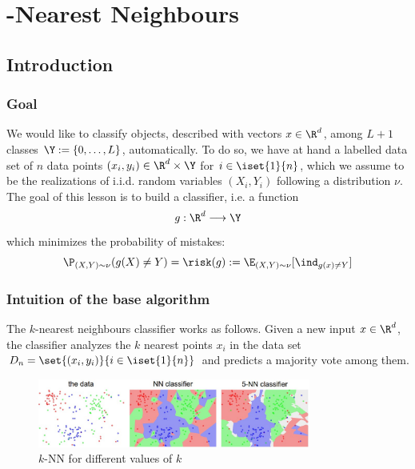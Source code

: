 \documentclass[toc, titlepaged]{../cs-classes/cs-classes}
\begin{document}

\section{-Nearest Neighbours}
\subsection{Introduction}
\subsubsection{Goal}
We would like to classify objects, described with vectors $x\in\R^d$, among $L+1$ classes $\Y:=\{0, \dots, L\}$, automatically. To do so, we have at hand a labelled data set of $n$ data points $(x_i, y_i)\in\R^d\times\Y$ for $i\in\iset{1}{n}$, which we assume to be the realizations of i.i.d. random variables $(X_i, Y_i)$ following a distribution $\nu$. The goal of this lesson is to build a classifier, i.e. a function
\begin{equation*}
    g:\R^d\longrightarrow\Y
\end{equation*}
which minimizes the probability of mistakes:
\begin{equation*}
    \P_{(X, Y)\sim\nu}(g(X)\neq Y) = \risk(g) := \E_{(X, Y)\sim\nu}[\ind_{g(x)\neq Y}]
\end{equation*}

\subsubsection{Intuition of the base algorithm}
The $k$-nearest neighbours classifier works as follows. Given a new input $x\in\R^d$, the classifier analyzes the $k$ nearest points $x_i$ in the data set $D_n=\set{(x_i, y_i)}{i\in\iset{1}{n}}$ and predicts a majority vote among them.

\begin{figure}[H]
    \centering
    \includegraphics[width=0.8\textwidth]{images/knn.jpeg}
    \caption{$k$-NN for different values of $k$}
\end{figure}
\end{document}
